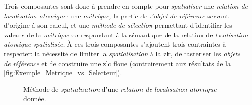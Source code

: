 
Trois composantes sont donc à prendre en compte pour
\emph{spatialiser} une \emph{relation de localisation atomique:} une
\emph{métrique,} la partie de \emph{l'objet de référence} servant
d'origine à son calcul, et une \emph{méthode de sélection} permettant
d'identifier les valeurs de la \emph{métrique} correspondant à la
sémantique de la relation de \emph{localisation atomique spatialisée.}
À ces trois composantes s'ajoutent trois contraintes à respecter: la
nécessité de limiter la \emph{spatialisation} à la \ac{zir}, de
rasteriser les \emph{objets de référence} et de construire une
\ac{zlc} floue (contrairement aux résultats de la
\autoref{fig:Exemple_Metrique_vs_Selecteur}).

\begin{figure}
  \centering
  
  \caption{Méthode de \emph{spatialisation} d'une \emph{relation de
      localisation atomique} donnée.}
  \label{fig:methodo_spatialisation}
\end{figure}

